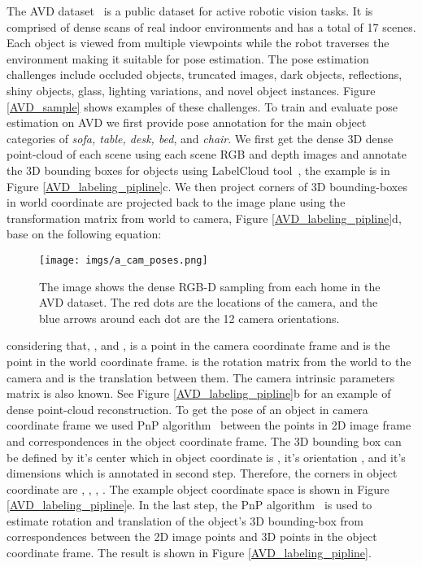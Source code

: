 \documentclass[letterpaper, 10 pt, conference]{ieeeconf}  \pdfoutput=1
\begin{document}
The AVD dataset~\cite{Ammirato2017ADF} is a public dataset for active robotic vision tasks. It is comprised of dense scans of real indoor environments and has a total of 17 scenes. 
Each object is viewed from multiple viewpoints while the robot traverses the environment making it suitable for pose estimation. The pose estimation challenges include occluded objects, truncated images, dark objects, reflections, shiny objects, glass, lighting variations, and novel object instances. Figure \ref{AVD_sample} shows examples of these challenges. 
To train and evaluate pose estimation on AVD we
first provide pose annotation for the main object categories of {\em sofa, table, desk, bed}, and {\em chair}.
We first get the dense 3D dense point-cloud of each scene using each scene RGB and depth images and annotate the 3D bounding boxes for objects using 
LabelCloud tool~\cite{Sager2021labelCloudAL}, the example is in Figure \ref{AVD_labeling_pipline}c.
We then project corners of 3D bounding-boxes in world coordinate are projected back to the image plane using the transformation matrix from world to camera, Figure \ref{AVD_labeling_pipline}d, base on the following equation: 
\begin{figure}[htbp]
\begin{center}
\texttt{[image: imgs/a\_cam\_poses.png]}
\end{center}
   \caption{The image shows the dense RGB-D sampling from each home in the AVD dataset. The red dots are the locations of the camera, and the blue arrows around each dot are the 12 camera orientations.}
\label{vew_AVD}
\end{figure}
considering that, , and ,  is a point in the camera coordinate frame and  is the point in the world coordinate frame.  is the rotation matrix from the world to the camera and  is the translation between them. The camera intrinsic parameters matrix  is also known. See Figure \ref{AVD_labeling_pipline}b for an example of dense point-cloud reconstruction. 
To get the pose of an object in camera coordinate frame we used PnP algorithm~\cite{Lepetit2008EPnPAA} between the points in 2D image frame and correspondences in the object coordinate frame. The 3D bounding box can be defined by it's center  which in object coordinate is , it's orientation , and it's dimensions  which is annotated in second step. Therefore, the corners in object coordinate are , , , . The example object coordinate space is shown in Figure \ref{AVD_labeling_pipline}e.
In the last step, the PnP algorithm~\cite{Lepetit2008EPnPAA} is used to estimate rotation and translation of the object's 3D bounding-box from correspondences between the 2D image points and 3D points in the object coordinate frame. The result is shown in Figure \ref{AVD_labeling_pipline}.
\end{document}
